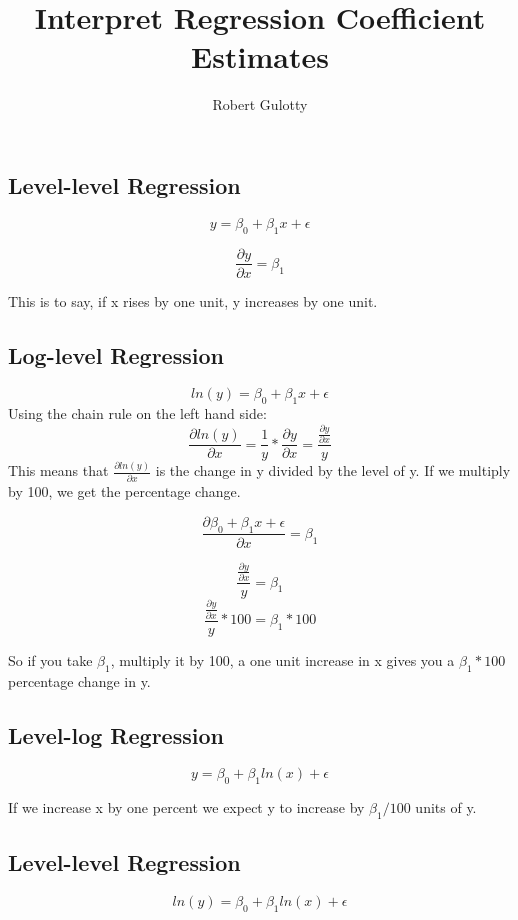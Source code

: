 \documentclass[12pt]{article}
\begin{document}
\title{Interpret Regression Coefficient Estimates}
\author{Robert Gulotty}

\maketitle

\subsection{Level-level Regression}

$$y=\beta_0+\beta_1x+\epsilon$$

$$\frac{\partial y}{\partial x}=\beta_1$$

This is to say, if x rises by one unit, y increases by one unit.


\subsection{Log-level Regression}

$$ln(y)=\beta_0+\beta_1x+\epsilon$$
Using the chain rule on the left hand side:
$$\frac{\partial ln(y)}{\partial x}=\frac{1}{y}*\frac{\partial y}{\partial x}=\frac{\frac{\partial y}{\partial x}}{y}$$
This means that $\frac{\partial ln(y)}{\partial x}$ is the change in y divided by the level of y.  If we multiply by 100, we get the percentage change.

$$\frac{\partial \beta_0+\beta_1x+\epsilon}{\partial x}=\beta_1$$

$$\frac{\frac{\partial y}{\partial x}}{y}=\beta_1$$
$$\frac{\frac{\partial y}{\partial x}}{y}*100=\beta_1*100$$

So if you take $\beta_1$, multiply it by 100, a one unit increase in x gives you a $\beta_1*100$ percentage change in y.



\subsection{Level-log Regression}

$$y=\beta_0+\beta_1ln(x)+\epsilon$$

If we increase x by one percent we expect y to increase by $\beta_1/100$ units of y.

\subsection{Level-level Regression}

$$ln(y)=\beta_0+\beta_1ln(x)+\epsilon$$
\end{document}
